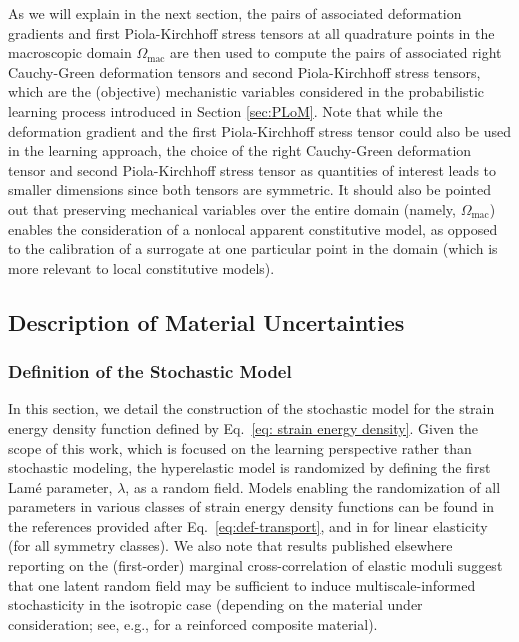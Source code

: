 As we will explain in the next section, the pairs of associated deformation gradients and first Piola-Kirchhoff stress tensors at all quadrature points in the macroscopic domain $\Omega_\text{mac}$ are then used to compute the pairs of associated right Cauchy-Green deformation tensors and second Piola-Kirchhoff stress tensors, which are the (objective) mechanistic variables considered in the probabilistic learning process introduced in Section \ref{sec:PLoM}. Note that while the deformation gradient and the first Piola-Kirchhoff stress tensor could also be used in the learning approach, the choice of the right Cauchy-Green deformation tensor and second Piola-Kirchhoff stress tensor as quantities of interest leads to smaller dimensions since both tensors are symmetric. It should also be pointed out that preserving mechanical variables over the entire domain (namely, $\Omega_\text{mac}$) enables the consideration of a nonlocal apparent constitutive model, as opposed to the calibration of a surrogate at one particular point in the domain (which is more relevant to local constitutive models).

\subsection{Description of Material Uncertainties}\label{subsec:material-model}
\subsubsection{Definition of the Stochastic Model}
\label{subsubsec:sto-model}
In this section, we detail the construction of the stochastic model for the strain energy density function defined by Eq.~\eqref{eq: strain energy density}. Given the scope of this work, which is focused on the learning perspective rather than stochastic modeling, the hyperelastic model is randomized by defining the first Lam\'e parameter, $\lambda$, as a random field. Models enabling the randomization of all parameters in various classes of strain energy density functions can be found in the references provided after Eq.~\eqref{eq:def-transport}, and in \cite{JE-2013,STABER2017399} for linear elasticity (for all symmetry classes). We also note that results published elsewhere reporting on the (first-order) marginal cross-correlation of elastic moduli suggest that one latent random field may be sufficient to induce multiscale-informed stochasticity in the isotropic case (depending on the material under consideration; see, e.g., \cite{Hun2019} for a reinforced composite material).

